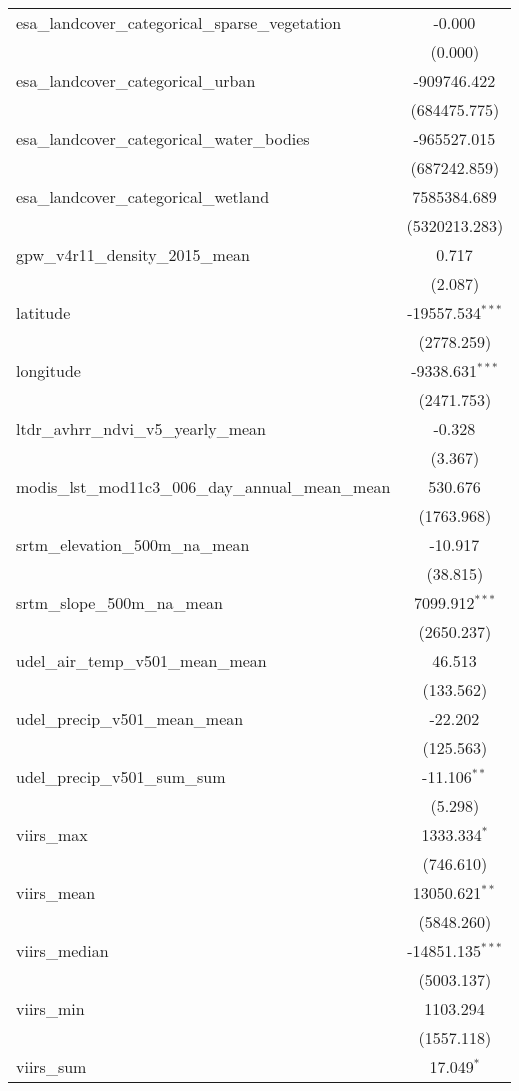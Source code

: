 \begin{table}[!htbp]
\begin{tabular}{@{\extracolsep{5pt}}lc}
 esa_landcover_categorical_sparse_vegetation & -0.000$^{}$ \\
  & (0.000) \\
 esa_landcover_categorical_urban & -909746.422$^{}$ \\
  & (684475.775) \\
 esa_landcover_categorical_water_bodies & -965527.015$^{}$ \\
  & (687242.859) \\
 esa_landcover_categorical_wetland & 7585384.689$^{}$ \\
  & (5320213.283) \\
 gpw_v4r11_density_2015_mean & 0.717$^{}$ \\
  & (2.087) \\
 latitude & -19557.534$^{***}$ \\
  & (2778.259) \\
 longitude & -9338.631$^{***}$ \\
  & (2471.753) \\
 ltdr_avhrr_ndvi_v5_yearly_mean & -0.328$^{}$ \\
  & (3.367) \\
 modis_lst_mod11c3_006_day_annual_mean_mean & 530.676$^{}$ \\
  & (1763.968) \\
 srtm_elevation_500m_na_mean & -10.917$^{}$ \\
  & (38.815) \\
 srtm_slope_500m_na_mean & 7099.912$^{***}$ \\
  & (2650.237) \\
 udel_air_temp_v501_mean_mean & 46.513$^{}$ \\
  & (133.562) \\
 udel_precip_v501_mean_mean & -22.202$^{}$ \\
  & (125.563) \\
 udel_precip_v501_sum_sum & -11.106$^{**}$ \\
  & (5.298) \\
 viirs_max & 1333.334$^{*}$ \\
  & (746.610) \\
 viirs_mean & 13050.621$^{**}$ \\
  & (5848.260) \\
 viirs_median & -14851.135$^{***}$ \\
  & (5003.137) \\
 viirs_min & 1103.294$^{}$ \\
  & (1557.118) \\
 viirs_sum & 17.049$^{*}$ \\

\end{tabular}
\end{table}
